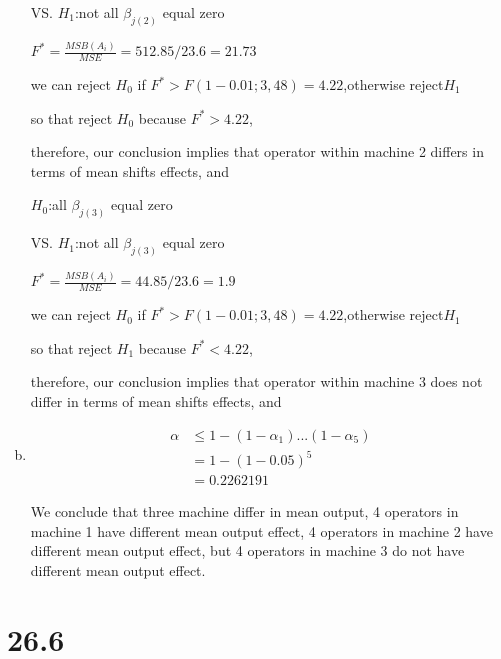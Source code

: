 \documentclass{article}\usepackage[]{graphicx}\usepackage[]{color}
\begin{document}
\begin{enumerate}[(a)]
\begin{center}
VS. $H_1$:not all $\beta_{j(2)}$ equal zero

$F^*=\frac{MSB(A_i)}{MSE} = 512.85/23.6  = 21.73$

we can reject $H_0$ if $F^* > F(1-0.01;3,48)=4.22$,otherwise reject$H_1$

so that reject $H_0$ because $F^*>4.22$,

therefore, our conclusion implies that operator within machine 2 differs in terms of mean shifts effects, and 
\end{center}

\begin{center}
$H_0$:all $\beta_{j(3)}$ equal zero

VS. $H_1$:not all $\beta_{j(3)}$ equal zero

$F^*=\frac{MSB(A_i)}{MSE} = 44.85/23.6  = 1.9$

we can reject $H_0$ if $F^* > F(1-0.01;3,48)=4.22$,otherwise reject$H_1$

so that reject $H_1$ because $F^*<4.22$,

therefore, our conclusion implies that operator within machine 3 does not differ in terms of mean shifts effects, and 
\end{center}

\item

\begin{displaymath}
\begin{split}
  \alpha &\leq 1 -(1-\alpha_1)...(1-\alpha_5)\\
         &= 1-(1-0.05)^5\\
         &= 0.2262191
\end{split}
\end{displaymath}

\qquad We conclude that three machine differ in mean output, 4 operators in machine 1 have different mean output effect, 4 operators in machine 2 have different mean output effect, but 4 operators in machine 3 do not have different mean output effect.

\end{enumerate}

\section{26.6}
\end{document}
